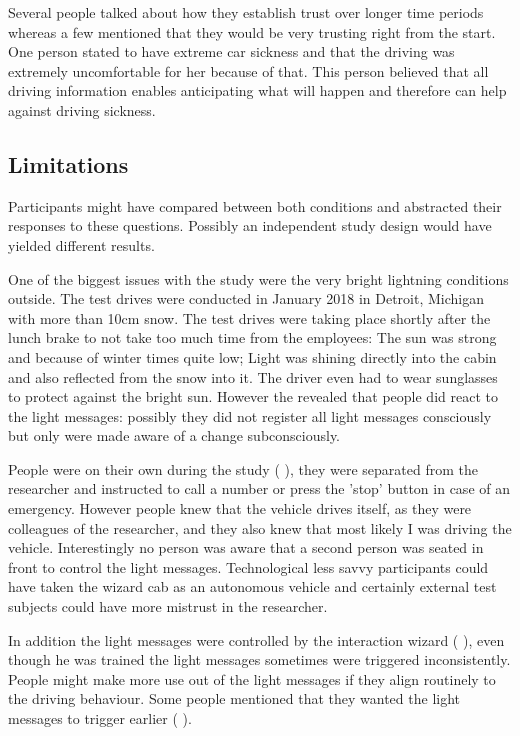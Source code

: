 Several people talked about how they establish trust over longer time periods whereas a few mentioned that they would be very trusting right from the start. One person stated to have extreme car sickness and that the driving was extremely uncomfortable for her because of that. This person believed that all driving information enables anticipating what will happen and therefore can help against driving sickness. 

\subsection{Limitations}
\label{sec:limitations}
Participants might have compared between both conditions and abstracted their responses to these questions. Possibly an independent study design would have yielded different results.

One of the biggest issues with the study were the very bright lightning conditions outside. The test drives were conducted in January 2018 in Detroit, Michigan with more than 10cm snow. The test drives were taking place shortly after the lunch brake to not take too much time from the employees: The sun was strong and because of winter times quite low; Light was shining directly into the cabin and also reflected from the snow into it. The driver even had to wear sunglasses to protect against the bright sun. However the  revealed that people did react to the light messages: possibly they did not register all light messages consciously but only were made aware of a change subconsciously. 

People were on their own during the study ( ), they were separated from the researcher and instructed to call a number or press the 'stop' button in case of an emergency. However people knew that the vehicle drives itself, as they were colleagues of the researcher, and they also knew that most likely I was driving the vehicle. Interestingly no person was aware that a second person was seated in front to control the light messages. Technological less savvy participants could have taken the wizard cab as an autonomous vehicle and certainly external test subjects could have more mistrust in the researcher.

In addition the light messages were controlled by the interaction wizard ( ), even though he was trained the light messages sometimes were triggered inconsistently. People might make more use out of the light messages if they align routinely to the driving behaviour. Some people mentioned that they wanted the light messages to trigger earlier ( ). 

